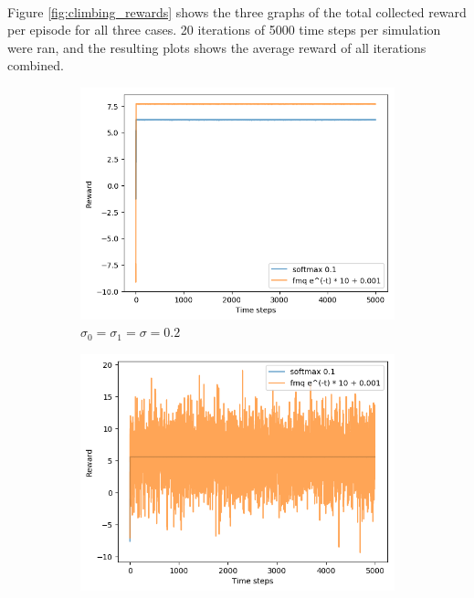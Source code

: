 \documentclass[letterpaper]{article}
\begin{document}
\paragraph{}

Figure \ref{fig:climbing_rewards} shows the three graphs of the
total collected reward per episode for all three cases.
20 iterations of 5000 time steps per simulation were ran, and the resulting
plots shows the average reward of all iterations combined.

\begin{figure}[H]
  \begin{subfigure}{.5\textwidth}
    \centering
    \includegraphics[width=1\linewidth]{images/assign3/exa/rewards}
    \caption{$\sigma_0 = \sigma_1 = \sigma = 0.2$}
    \label{fig:climbing_rewards_exa}
  \end{subfigure}
  \begin{subfigure}{.5\textwidth}
    \centering
    \includegraphics[width=1\linewidth]{images/assign3/exb/rewards}

\end{subfigure}
\end{figure}
\end{document}
